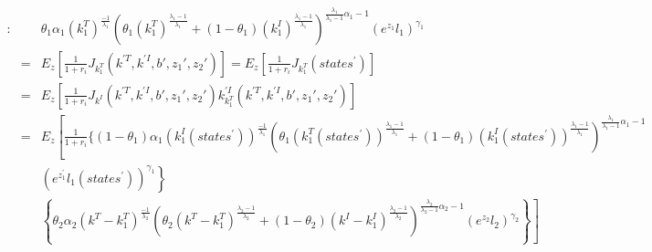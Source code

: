 \documentclass{article}
\begin{document}
\begin{eqnarray}
     [k_1^T]: & &                                                  \theta_1 \alpha_1 (k_{1}^T)^{\frac{-1}{\lambda_1}} \left( \theta_1 (k_{1}^T)^{\frac{\lambda_1-1}{\lambda_1}} +(1-\theta_1)(k_{1}^I)^{\frac{\lambda_1-1}{\lambda_1}} \right)^{\frac{\lambda_1}{\lambda_1-1}\alpha_1-1} \left( e^{z_{1}}l_{1} \right)^{\gamma_1}   \nonumber \\
     & = &  E_z\left[\frac{1}{1+r_i} J_{k_1^T}(k^{\prime T},k^{\prime I},b{\prime},z_{1}{\prime },z_{2}{\prime})   \right] = E_z\left[\frac{1}{1+r_i} J_{k_1^T}(states^\prime)   \right] \nonumber \\
     & = &  E_z\left[\frac{1}{1+r_i} J_{k^I}(k^{\prime T},k^{\prime I},b{\prime},z_{1}{\prime },z_{2}{\prime}) k_{k_1^T}^{\prime I}(k^{\prime T},k^{\prime I},b{\prime},z_{1}{\prime },z_{2}{\prime})  \right] \nonumber \\
     & = &  E_z \left[ \frac{1}{1+r_i} \{ (1-\theta_1) \alpha_1 (k_{1}^I(states^\prime) )^{\frac{-1}{\lambda_1}}    \left( \theta_1 (k_{1}^T(states^\prime) )^{\frac{\lambda_1-1}{\lambda_1}} +(1-\theta_1)(k_{1}^I(states^\prime) )^{\frac{\lambda_1-1}{\lambda_1}} \right)^{\frac{\lambda_1}{\lambda_1-1}\alpha_1-1} \right. \nonumber \\
     &  &  \left.  \left( e^{z_{1}^\prime}l_{1}(states^\prime) \right)^{\gamma_1}  \right\rbrace    \nonumber \\
     &  &  \left.  \left\lbrace \theta_2 \alpha_2 (k^T - k_{1}^T)^{\frac{-1}{\lambda_2}} \left( \theta_2 (k^T - k_{1}^T)^{\frac{\lambda_2-1}{\lambda_2}} +(1-\theta_2)(k^I - k_{1}^I)^{\frac{\lambda_2-1}{\lambda_2}} \right)^{\frac{\lambda_2}{\lambda_2-1}\alpha_2-1} \left( e^{z_{2}}l_{2} \right)^{\gamma_2} \right\rbrace  \right]
\end{eqnarray}
\end{document}

